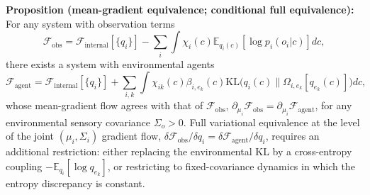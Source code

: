 \documentclass[11pt]{article}
\begin{document}
\textbf{Proposition (mean-gradient equivalence; conditional full equivalence):} For any system with observation terms
\begin{equation}
\mathcal{F}_{\text{obs}} = \mathcal{F}_{\text{internal}}[\{q_i\}] - \sum_i \int \chi_i(c)  \mathbb{E}_{q_i(c)}[\log p_i(o_i|c)]  dc,
\end{equation}
there exists a system with environmental agents
\begin{equation}
\mathcal{F}_{\text{agent}} = \mathcal{F}_{\text{internal}}[\{q_i\}] + \sum_{i,k} \int \chi_{ik}(c)  \beta_{i,e_k}(c)  \mathrm{KL}\big(q_i(c) \| \Omega_{i,e_k}[q_{e_k}(c)]\big)  dc,
\end{equation}
whose mean-gradient flow agrees with that of $\mathcal{F}_{\text{obs}}$, $\partial_{\mu_i}\mathcal{F}_{\text{obs}} = \partial_{\mu_i}\mathcal{F}_{\text{agent}}$, for any environmental sensory covariance $\Sigma_o > 0$. Full variational equivalence at the level of the joint $(\mu_i, \Sigma_i)$ gradient flow, $\delta \mathcal{F}_{\text{obs}}/\delta q_i = \delta \mathcal{F}_{\text{agent}}/\delta q_i$, requires an additional restriction: either replacing the environmental KL by a cross-entropy coupling $-\mathbb{E}_{q_i}[\log q_{e_k}]$, or restricting to fixed-covariance dynamics in which the entropy discrepancy is constant.
\end{document}
